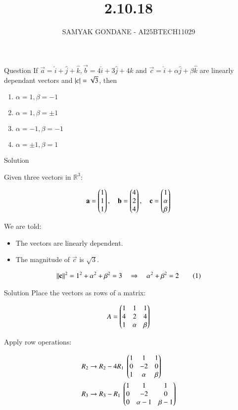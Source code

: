 \documentclass{beamer}
\title 
{2.10.18}
\date{}
\author
{SAMYAK GONDANE - AI25BTECH11029}
\begin{document}
\frame{\titlepage}

\begin{frame}{Question}
If $\vec{a} = \hat{i} + \hat{j} + \hat{k}, \vec{b} = 4\hat{i} + 3\hat{j} + 4\hat{k}$ and $\vec{c} = \hat{i} + \alpha\hat{j} + \beta\hat{k}$ are linearly dependant vectors and $\left\vert c\right\vert = \sqrt{3}$, then
\begin{multicols}{2}
\begin{enumerate}
    \item $\alpha = 1, \beta = -1$
    \item $\alpha = 1, \beta = \pm1$
    \item $\alpha = -1, \beta = -1$
    \item $\alpha = \pm1, \beta = 1$
\end{enumerate}
\end{multicols}
\end{frame}

\begin{frame}{Solution}

Given three vectors in $\mathbb{R}^3$:

\begin{align}
\mathbf{a} = \begin{pmatrix}1 \\ 1 \\ 1\end{pmatrix}, \quad
\mathbf{b} = \begin{pmatrix}4 \\ 2 \\ 4\end{pmatrix}, \quad
\mathbf{c} = \begin{pmatrix}1 \\ \alpha \\ \beta\end{pmatrix}
\end{align}

We are told:
\begin{itemize}
    \item The vectors are linearly dependent.
    \item The magnitude of $\vec{c}$ is $\sqrt{3}$.
\end{itemize}

\begin{align}
\left\lVert\mathbf{c}\right\rVert^2 = 1^2 + \alpha^2 + \beta^2 = 3 \quad \Rightarrow \quad \alpha^2 + \beta^2 = 2 \tag{1}
\end{align}
\end{frame}

\begin{frame}{Solution}
Place the vectors as rows of a matrix:

\begin{align}
A = \begin{pmatrix}
1 & 1 & 1 \\
4 & 2 & 4 \\
1 & \alpha & \beta
\end{pmatrix}
\end{align}

Apply row operations:

\begin{align}
R_2 &\rightarrow R_2 - 4R_1 \
\begin{pmatrix}
1 & 1 & 1 \\
0 & -2 & 0 \\
1 & \alpha & \beta
\end{pmatrix}\\
R_3 &\rightarrow R_3 - R_1 \
\begin{pmatrix}
1 & 1 & 1 \\
0 & -2 & 0 \\
0 & \alpha - 1 & \beta - 1
\end{pmatrix}
\end{align}
\end{frame}
\end{document}
